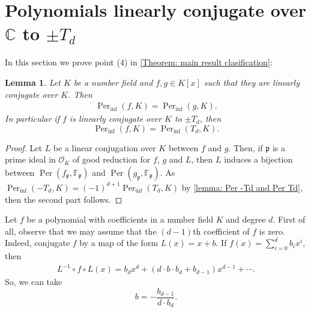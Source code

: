 \documentclass{amsart}
\def\OK{\mathcal{O}_K}
\def\FF{\mathbb F}
\def\CC{\mathbb C}
\DeclareMathOperator{\Per}{Per}
\newtheorem{lemma}[proposition]{Lemma}
\theoremstyle{definition}
\begin{document}
\section{Polynomials linearly conjugate over $\CC$ to $\pm T_d$} 
\label{section: Polynomials linearly conjugate over C to T_d}

In this section we prove point (4) in \cref{Theorem: main result clasification}:

\begin{lemma}
\label{lemma: Perinf when conjugating in K}
Let $K$ be a number field and $f,g \in K[x]$ such that they are linearly conjugate over $K$. Then
\begin{align*}
\Per_{\inf}(f,K) = \Per_{\inf}(g,K).
\end{align*}
In particular if $f$ is linearly conjugate over $K$ to $\pm T_d$, then 
$$\Per_{\inf}(f,K) = \Per_{\inf}(T_d,K).$$
\end{lemma}

\begin{proof}
Let $L$ be a linear conjugation over $K$ between $f$ and $g$. Then, if $\mathfrak{p}$ is a prime ideal in $\OK$ of good reduction for $f$, $g$ and $L$, then $L$ induces a bijection between $\Per(f_\mathfrak{p},\FF_\mathfrak{p})$ and $\Per(g_\mathfrak{p},\FF_\mathfrak{p})$. As $\Per_{\inf}(-T_d,K) = (-1)^{d+1}\Per_{\inf}(T_d,K)$ by \cref{lemma: Per -Td and Per Td}, then the second part follows.
\end{proof}

Let $f$ be a polynomial with coefficients in a number field $K$ and degree $d$. First of all, observe that we may assume that the $(d-1)$th coefficient of $f$ is zero. Indeed, conjugate $f$ by a map of the form $L(x) = x+b$. If $f(x) = \sum_{i = 0}^d b_i x^i$, then 
\begin{align*}
L^{-1} \circ f \circ L(x) = b_dx^d + (d \cdot b \cdot b_d + b_{d-1})x^{d-1} + \cdots.
\end{align*}
So, we can take $$b = -\frac{b_{d-1}}{d \cdot b_d}.$$
\end{document}

